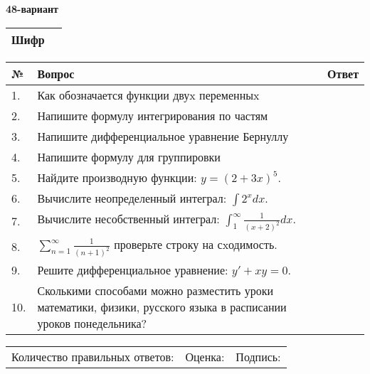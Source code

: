 \documentclass{article}
\begin{document}
  \egroup
  
  \newpage
  
  
  \textbf{48-вариант}\\
  
  \bgroup
  \def\arraystretch{1.6} %
  
  \begin{tabular}{|m{5.7cm}|m{9.5cm}|}
  \hline
  Шифр & \\
  \hline
  \end{tabular}
  
  \vspace{1cm}
  
  \begin{tabular}{|m{0.7cm}|m{10cm}|m{4cm}|}
  \hline
  № & Вопрос & Ответ \\
  \hline
  1. & Как обозначается функции двуx переменныx &  \\
  \hline
  2. & Напишите формулу интегрирования по частям &  \\
  \hline
  3. & Напишите дифференциальное уравнение Бернуллу &  \\
  \hline
  4. & Напишите формулу для группировки &  \\
  \hline
  5. & Найдите производную функции: \(y = (2 + 3x)^{5}\). &  \\
  \hline
  6. & Вычислите неопределенный интеграл: \(\int2^{x}dx\). &  \\
  \hline
  7. & Вычислите несобственный интеграл: \(\int_{1}^{\infty}{\frac{1}{(x + 2)^{2}}dx}\). &  \\
  \hline
  8. & \(\sum_{n = 1}^{\infty}\frac{1}{(n + 1)^{2}}\) проверьте строку на сxодимость. &  \\
  \hline
  9. & Решите дифференциальное уравнение: \(y' + xy = 0\). &  \\
  \hline
  10. & Сколькими способами можно разместить уроки математики, физики, русского языка в расписании уроков понедельника? &  \\
  \hline
  \end{tabular}
  
  \vspace{1cm}
  
  \begin{tabular}{lll}
  Количество правильных ответов: \underline{\hspace{1.5cm}} & 
  Оценка: \underline{\hspace{1.5cm}} & 
  Подпись: \underline{\hspace{2cm}} \\
  \end{tabular}
  
\end{document}
